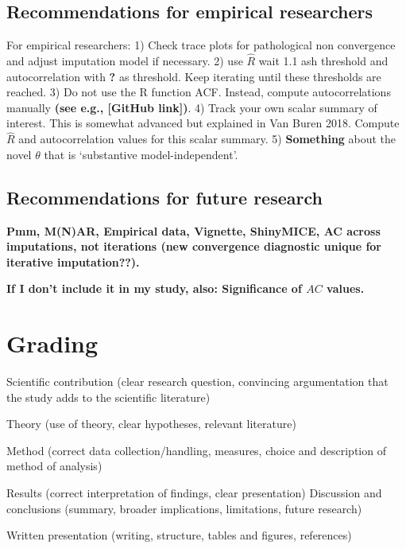\documentclass[Royal,times,sageh]{sagej}
\begin{document}
\hypertarget{recommendations-for-empirical-researchers}{%
\subsection{Recommendations for empirical
researchers}\label{recommendations-for-empirical-researchers}}

For empirical researchers: 1) Check trace plots for pathological non
convergence and adjust imputation model if necessary. 2) use
\(\widehat{R}\) wait 1.1 ash threshold and autocorrelation with
\textbf{?} as threshold. Keep iterating until these thresholds are
reached. 3) Do not use the R function ACF. Instead, compute
autocorrelations manually \textbf{(see e.g., {[}GitHub link{]})}. 4)
Track your own scalar summary of interest. This is somewhat advanced but
explained in Van Buren 2018. Compute \(\widehat{R}\) and autocorrelation
values for this scalar summary. 5) \textbf{Something} about the novel
\(\theta\) that is `substantive model-independent'.

\hypertarget{recommendations-for-future-research}{%
\subsection{Recommendations for future
research}\label{recommendations-for-future-research}}

\textbf{Pmm, M(N)AR, Empirical data, Vignette, ShinyMICE, AC across
imputations, not iterations (new convergence diagnostic unique for
iterative imputation??).}

\textbf{If I don't include it in my study, also: Significance of \(AC\)
values.}

\hypertarget{grading}{%
\section{Grading}\label{grading}}

Scientific contribution (clear research question, convincing
argumentation that the study adds to the scientific literature)

Theory (use of theory, clear hypotheses, relevant literature)

Method (correct data collection/handling, measures, choice and
description of method of analysis)

Results (correct interpretation of findings, clear presentation)
Discussion and conclusions (summary, broader implications, limitations,
future research)

Written presentation (writing, structure, tables and figures,
references)



\end{document}
